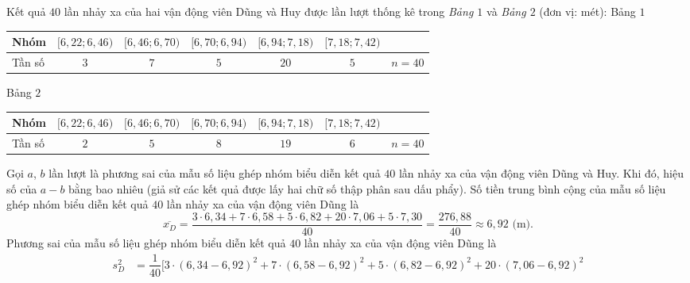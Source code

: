 \begin{bt}%
	Kết quả $40$ lần nhảy xa của hai vận động viên Dũng và Huy được lần lượt thống kê trong \textit{Bảng $1$} và \textit{Bảng $2$} (đơn vị: mét):
	Bảng $1$ 
	\begin{center}
		\begin{tabular}{|>{\centering\arraybackslash}m{3cm}|c|c|c|c|c|c|}
			\hline
			Nhóm & $[6{,}22; 6{,}46)$ & $[6{,}46; 6{,}70)$ & $[6{,}70; 6{,}94)$ & $[6{,}94; 7{,}18)$ & $[7{,}18; 7{,}42)$ &   \\ \hline
			Tần số & $3$ & $7$ & $5$ & $20$ & $5$ & $n = 40$ \\ \hline
		\end{tabular} 
	\end{center}
	Bảng $2$
	\begin{center}
		\begin{tabular}{|>{\centering\arraybackslash}m{3cm}|c|c|c|c|c|c|}
			\hline
			Nhóm & $[6{,}22; 6{,}46)$ & $[6{,}46; 6{,}70)$ & $[6{,}70; 6{,}94)$ & $[6{,}94; 7{,}18)$ & $[7{,}18; 7{,}42)$ &   \\ \hline
			Tần số & $2$ & $5$ & $8$ & $19$ & $6$ & $n = 40$ \\ \hline
		\end{tabular} 
	\end{center}
	Gọi $a$, $b$ lần lượt là phương sai của mẫu số liệu ghép nhóm biểu diễn kết quả $40$ lần nhảy xa của vận động viên Dũng và Huy. Khi đó, hiệu số của $a - b$ bằng bao nhiêu (giả sử các kết quả được lấy hai chữ số thập phân sau dấu phẩy).
	\loigiai
	{ Số tiền trung bình cộng của mẫu số liệu ghép nhóm biểu diễn kết quả $40$ lần nhảy xa của vận động viên Dũng là
		\[\overline{x_D} = \dfrac{3 \cdot 6{,}34 + 7 \cdot 6{,}58 + 5 \cdot 6{,}82 + 20 \cdot 7{,}06 + 5 \cdot 7{,}30}{40} = \dfrac{276{,}88}{40} \approx 6{,}92 \text{ (m).}\]
		Phương sai của mẫu số liệu ghép nhóm biểu diễn kết quả $40$ lần nhảy xa của vận động viên Dũng là 
		\begin{align*}
		s_D^2 &= \dfrac{1}{40}\big[3 \cdot (6{,}34 - 6{,}92)^2 + 7 \cdot (6{,}58 - 6{,}92)^2 + 5 \cdot (6{,}82 - 6{,}92)^2 + 20 \cdot (7{,}06 - 6{,}92)^2 \\

\end{align*}}
\end{bt}
